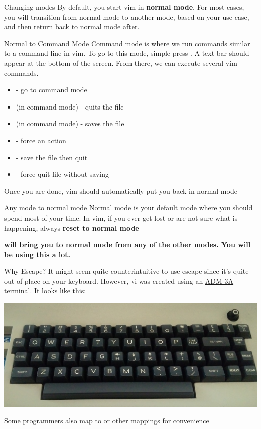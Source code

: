\documentclass[12pt]{beamer}
\begin{document}
\begin{frame}{Changing modes}
    By default, you start vim in \textbf{normal mode}. For most cases, you will transition from normal mode to 
    another mode, based on your use case, and then return back to normal mode after.
\end{frame}{}

\begin{frame}{Normal to Command Mode}
    Command mode is where we run commands similar to a command line in vim.
    To go to this mode, simple press \keys{:}. A text bar should appear at the bottom of the screen. From there,
    we can execute several vim commands.
    \begin{itemize}
        \item \keys{:} - go to command mode
        \item {} (in command mode) - quits the file
        \item {} (in command mode) - saves the file
        \item \keys{!} - force an action
        \item {} - save the file then quit
        \item {} - force quit file without saving
    \end{itemize}{}
    Once you are done, vim should automatically put you back in normal mode
\end{frame}{}

\begin{frame}{Any mode to normal mode}
    Normal mode is your default mode where you should spend most of your time. In vim, if you ever get lost
    or are not sure what is happening, always \textbf{reset to normal mode}
    
    \textbf{
     will bring you to normal mode from any of the other modes. You will be using this a lot.
    }
\end{frame}{}

\begin{frame}{Why Escape?}
    It might seem quite counterintuitive to use escape since it's quite out of place on your keyboard. However, 
    vi was created using an \underline{ADM-3A terminal}. It looks like this:
    \begin{center}
        \includegraphics[width=0.75\linewidth]{adm-3a.png}
    \end{center}{}
    Some programmers also map  to  or other mappings for convenience
\end{frame}
\end{document}
